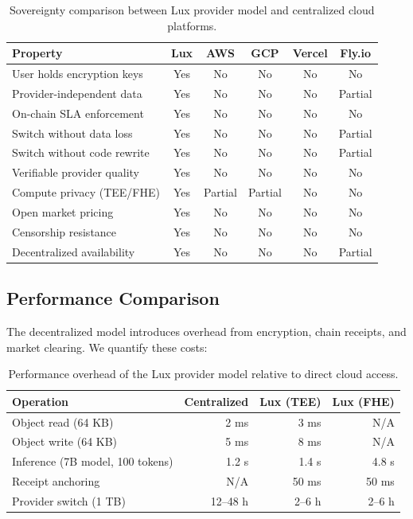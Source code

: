 \documentclass[11pt,a4paper]{article}
\begin{document}
\begin{table}[H]
\centering
\caption{Sovereignty comparison between Lux provider model and centralized cloud platforms.}
\label{tab:comparison}
\begin{tabular}{p{3.5cm}ccccc}
\toprule
\textbf{Property} & \textbf{Lux} & \textbf{AWS} & \textbf{GCP} & \textbf{Vercel} & \textbf{Fly.io} \\
\midrule
User holds encryption keys & Yes & No & No & No & No \\
Provider-independent data & Yes & No & No & No & Partial \\
On-chain SLA enforcement & Yes & No & No & No & No \\
Switch without data loss & Yes & No & No & No & Partial \\
Switch without code rewrite & Yes & No & No & No & Partial \\
Verifiable provider quality & Yes & No & No & No & No \\
Compute privacy (TEE/FHE) & Yes & Partial & Partial & No & No \\
Open market pricing & Yes & No & No & No & No \\
Censorship resistance & Yes & No & No & No & No \\
Decentralized availability & Yes & No & No & No & Partial \\
\bottomrule
\end{tabular}
\end{table}

\subsection{Performance Comparison}

The decentralized model introduces overhead from encryption, chain
receipts, and market clearing. We quantify these costs:

\begin{table}[H]
\centering
\caption{Performance overhead of the Lux provider model relative to direct cloud access.}
\label{tab:performance}
\begin{tabular}{lrrr}
\toprule
\textbf{Operation} & \textbf{Centralized} & \textbf{Lux (TEE)} & \textbf{Lux (FHE)} \\
\midrule
Object read (64 KB) & 2 ms & 3 ms & N/A \\
Object write (64 KB) & 5 ms & 8 ms & N/A \\
Inference (7B model, 100 tokens) & 1.2 s & 1.4 s & 4.8 s \\
Receipt anchoring & N/A & 50 ms & 50 ms \\
Provider switch (1 TB) & 12--48 h & 2--6 h & 2--6 h \\
\bottomrule
\end{tabular}
\end{table}
\end{document}
